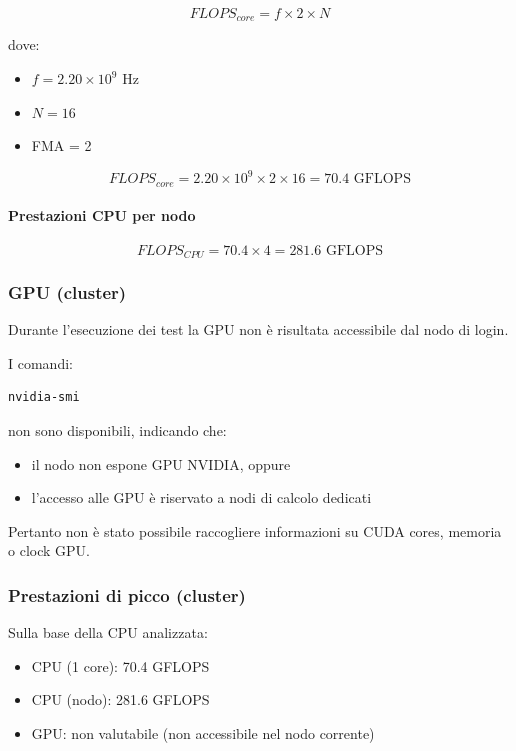 \documentclass[a4paper,12pt]{article}
\begin{document}
\[
FLOPS_{core} = f \times 2 \times N
\]

dove:

\begin{itemize}
    \item $f = 2.20 \times 10^9$ Hz
    \item $N = 16$
    \item FMA = 2
\end{itemize}

\[
FLOPS_{core} = 2.20 \times 10^9 \times 2 \times 16 = 70.4 \text{ GFLOPS}
\]

\paragraph{Prestazioni CPU per nodo}

\[
FLOPS_{CPU} = 70.4 \times 4 = 281.6 \text{ GFLOPS}
\]

\subsubsection{GPU (cluster)}

Durante l’esecuzione dei test la GPU non è risultata accessibile dal nodo di login.

I comandi:

\begin{verbatim}
nvidia-smi
\end{verbatim}

non sono disponibili, indicando che:
\begin{itemize}
    \item il nodo non espone GPU NVIDIA, oppure
    \item l’accesso alle GPU è riservato a nodi di calcolo dedicati
\end{itemize}

Pertanto non è stato possibile raccogliere informazioni su CUDA cores, memoria o clock GPU.

\subsubsection{Prestazioni di picco (cluster)}

Sulla base della CPU analizzata:

\begin{itemize}
    \item CPU (1 core): 70.4 GFLOPS
    \item CPU (nodo): 281.6 GFLOPS
    \item GPU: non valutabile (non accessibile nel nodo corrente)
\end{itemize}
\end{document}
